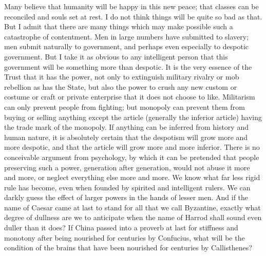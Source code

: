 \documentclass{book}
\begin{document}
Many believe that humanity will be happy in this new peace; that classes can be reconciled and souls set at rest. I do not think things will be quite so bad as that. But I admit that there are many things which may make possible such a catastrophe of contentment. Men in large numbers have submitted to slavery; men submit naturally to government, and perhaps even especially to despotic government. But I take it as obvious to any intelligent person that this government will be something more than despotic. It is the very essence of the Trust that it has the power, not only to extinguish military rivalry or mob rebellion as has the State, but also the power to crush any new custom or costume or craft or private enterprise that it does not choose to like. Militarism can only prevent people from fighting; but monopoly can prevent them from buying or selling anything except the article (generally the inferior article) having the trade mark of the monopoly. If anything can be inferred from history and human nature, it is absolutely certain that the despotism will grow more and more despotic, and that the article will grow more and more inferior. There is no conceivable argument from psychology, by which it can be pretended that people preserving such a power, generation after generation, would not abuse it more and more, or neglect everything else more and more. We know what far less rigid rule has become, even when founded by spirited and intelligent rulers. We can darkly guess the effect of larger powers in the hands of lesser men. And if the name of Caesar came at last to stand for all that we call Byzantine, exactly what degree of dullness are we to anticipate when the name of Harrod shall sound even duller than it does? If China passed into a proverb at last for stiffness and monotony after being nourished for centuries by Confucius, what will be the condition of the brains that have been nourished for centuries by Callisthenes?
\end{document}
